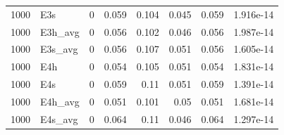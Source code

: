\begin{table}[!htbp]
{\begin{tabular}{rlrrrrrr}
1000 & E3s & 0 & 0.059 & 0.104 & 0.045 & 0.059 & 1.916e-14 \\
1000 & E3h_avg & 0 & 0.056 & 0.102 & 0.046 & 0.056 & 1.987e-14 \\
1000 & E3s_avg & 0 & 0.056 & 0.107 & 0.051 & 0.056 & 1.605e-14 \\
1000 & E4h & 0 & 0.054 & 0.105 & 0.051 & 0.054 & 1.831e-14 \\
1000 & E4s & 0 & 0.059 & 0.11 & 0.051 & 0.059 & 1.391e-14 \\
1000 & E4h_avg & 0 & 0.051 & 0.101 & 0.05 & 0.051 & 1.681e-14 \\
1000 & E4s_avg & 0 & 0.064 & 0.11 & 0.046 & 0.064 & 1.297e-14 \\
\bottomrule
\end{tabular}}

\end{table}
